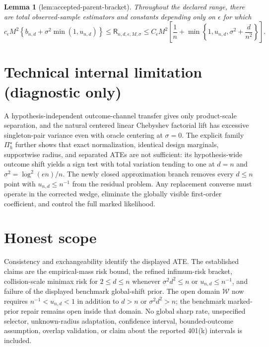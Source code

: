\documentclass{article}
\newtheorem{lemma}{Lemma}
\begin{document}
\begin{lemma}[lem:accepted-parent-bracket]\label{lem:accepted-parent-bracket}
Throughout the declared range, there are total observed-sample estimators and constants depending only on \(\epsilon\) for which
\[
 c_{\epsilon}M^2\left\{b_{n,d}+\sigma^2\min(1,u_{n,d})\right\}
 \leq \mathsf R_{n,d,\epsilon,M,\sigma}
 \leq C_{\epsilon}M^2\left[\frac1n+\min\left\{1,u_{n,d},\sigma^2+\frac d{n^2}\right\}\right].
\]
\end{lemma}

\section*{Technical internal limitation (diagnostic only)}

A hypothesis-independent outcome-channel transfer gives only product-scale separation, and the natural centered linear Chebyshev factorial lift has excessive singleton-pair variance even with oracle centering at \(\sigma=0\).  The explicit family \(\Pi_h^\star\) further shows that exact normalization, identical design marginals, supportwise radius, and separated ATEs are not sufficient: its hypothesis-wide outcome shift yields a sign test with total variation tending to one at \(d=n\) and \(\sigma^2=\log^2(en)/n\).  The newly closed approximation branch removes every \(d\le n\) point with \(u_{n,d}\le n^{-1}\) from the residual problem.  Any replacement converse must operate in the corrected wedge, eliminate the globally visible first-order coefficient, and control the full marked likelihood.

\section{Honest scope}

Consistency and exchangeability identify the displayed ATE.  The established claims are the empirical-mass risk bound, the refined infimum-risk bracket, collision-scale minimax risk for \(2\le d\le n\) whenever \(\sigma^2d^2\le n\) or \(u_{n,d}\le n^{-1}\), and failure of the displayed benchmark global-shift prior.  The open domain \(\mathcal W\) now requires \(n^{-1}<u_{n,d}<1\) in addition to \(d>n\) or \(\sigma^2d^2>n\); the benchmark marked-prior repair remains open inside that domain.  No global sharp rate, unspecified selector, unknown-radius adaptation, confidence interval, bounded-outcome assumption, overlap validation, or claim about the reported 401(k) intervals is included.
\end{document}
